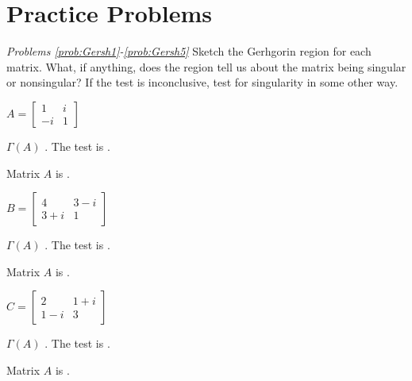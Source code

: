 \documentclass{ximera}
\begin{document}
\section*{Practice Problems}

\emph{Problems \ref{prob:Gersh1}-\ref{prob:Gersh5}}
    Sketch the Gerhgorin region for each matrix.  What, if anything, does the region tell us about the matrix being singular or nonsingular?  If the test is inconclusive, test for singularity in some other way.

\begin{problem}\label{prob:Gersh1}
$A = \left[ \begin{array}{rr}
1 & i\\
-i & 1
\end{array}\right]$

\begin{prompt}
$\Gamma (A)$ .  The test is .
\end{prompt}
\begin{problem}
Matrix $A$ is .
\end{problem}
\end{problem}

\begin{problem}\label{prob:Gersh2}
$B = \left[ \begin{array}{cc}
4 & 3 - i \\
3 + i & 1
\end{array}\right]$

\begin{prompt}
$\Gamma (A)$ .  The test is .
\end{prompt}
\begin{problem}
Matrix $A$ is .
\end{problem}
\end{problem}

\begin{problem}\label{prob:Gersh3}
$C = \left[ \begin{array}{cc}
2 & 1 + i\\
1 - i & 3
\end{array}\right]$

\begin{prompt}
$\Gamma (A)$ .  The test is .
\end{prompt}
\begin{problem}
Matrix $A$ is .
\end{problem}
\end{problem}
\end{document}
